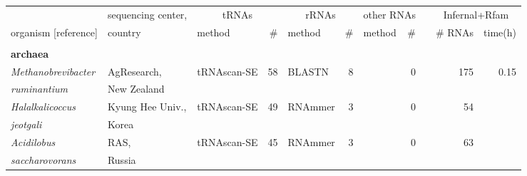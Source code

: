 \begin{footnotesize}
\begin{table}
\label{tbl:genomes}       
\begin{center}
\begin{tabular}{|ll|lr|lr|lr|c|rr|}
\hline
                                         & sequencing center,&\multicolumn{2}{c|}{tRNAs}&\multicolumn{2}{c|}{rRNAs}& \multicolumn{2}{c|}{other RNAs} & & \multicolumn{2}{|c|}{Infernal+Rfam} \\ \cline{3-8}
organism [reference]                     & country           & method        & \#       & method         & \# & method & \# & & \# RNAs & time(h) \\ \cline{1-8} \cline{9-11}
\multicolumn{11}{l}{} \\
\multicolumn{11}{l}{\textbf{archaea}} \\ \cline{1-8} \cline{9-11}
\emph{Methanobrevibacter}                & AgResearch,       & tRNAscan-SE   & 58       & BLASTN         & 8  &                & 0        & & 175 & 0.15 \\
\emph{ruminantium}                       & New Zealand       &               &          &                &    &                &          & & & \\ \cline{1-8} \cline{9-11}
\emph{Halalkalicoccus}                   & Kyung Hee Univ.,  & tRNAscan-SE   & 49       & RNAmmer        & 3  &                & 0        & & 54 & \\
\emph{jeotgali}                          & Korea             &               &          &                &    &                &          & & & \\ \cline{1-8} \cline{9-11}
\emph{Acidilobus}                        & RAS,              & tRNAscan-SE   & 45       & RNAmmer        & 3  &                & 0        & & 63 & \\
\emph{saccharovorans}                    & Russia            &               &          &                &    &                &          & & & \\ \cline{1-8} \cline{9-11}

\end{tabular}
\end{center}
\end{table}
\end{footnotesize}
